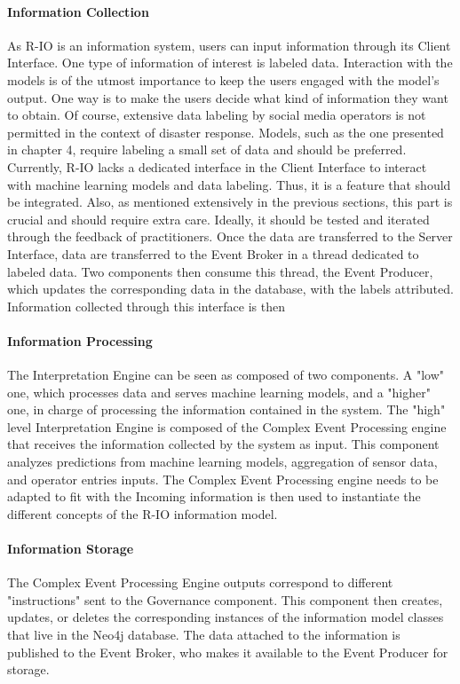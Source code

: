 \paragraph{Information Collection}
As R-IO is an information system, users can input information through its Client Interface.
One type of information of interest is labeled data.
Interaction with the models is of the utmost importance to keep the users engaged with the model's output.
One way is to make the users decide what kind of information they want to obtain.
Of course, extensive data labeling by social media operators is not permitted in the context of disaster response.
Models, such as the one presented in chapter 4, require labeling a small set of data and should be preferred.
Currently, R-IO lacks a dedicated interface in the Client Interface to interact with machine learning models and data labeling.
Thus, it is a feature that should be integrated.
Also, as mentioned extensively in the previous sections, this part is crucial and should require extra care.
Ideally, it should be tested and iterated through the feedback of practitioners.
Once the data are transferred to the Server Interface, data are transferred to the Event Broker in a thread dedicated to labeled data.
Two components then consume this thread, the Event Producer, which updates the corresponding data in the database, with the labels attributed.
Information collected through this interface is then
\paragraph{Information Processing}
The Interpretation Engine can be seen as composed of two components.
A "low" one, which processes data and serves machine learning models, and a "higher" one, in charge of processing the information contained in the system.
The "high" level Interpretation Engine is composed of the Complex Event Processing engine that receives the information collected by the system as input.
This component analyzes predictions from machine learning models, aggregation of sensor data, and operator entries inputs.
The Complex Event Processing engine needs to be adapted to fit with the
Incoming information is then used to instantiate the different concepts of the R-IO information model.
\paragraph{Information Storage}
The Complex Event Processing Engine outputs correspond to different "instructions" sent to the Governance component.
This component then creates, updates, or deletes the corresponding instances of the information model classes that live in the Neo4j database.
The data attached to the information is published to the Event Broker, who makes it available to the Event Producer for storage.
